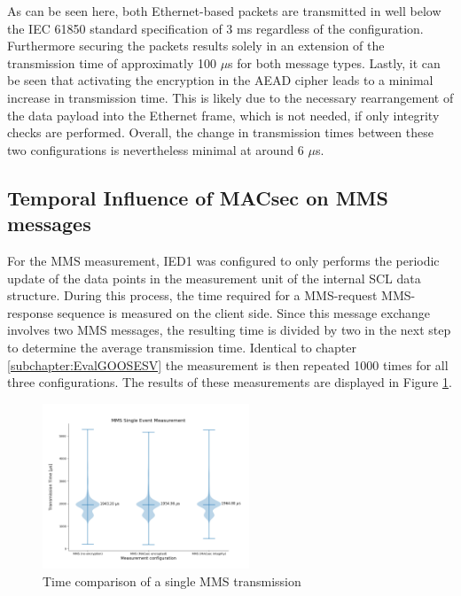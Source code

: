 \documentclass[conference, onecolumn, a4paper]{IEEEtran}
\begin{document}
\noindent As can be seen here, both Ethernet-based packets are transmitted in well below the IEC 61850 standard specification of 3 ms 
\cite{fixedLatencyGOOSESV:2021} regardless of the configuration. Furthermore securing the packets results solely in an extension of the transmission 
time of approximatly 100 $\mu$s for both message types. Lastly, it can be seen that activating the encryption in the AEAD cipher leads to a minimal 
increase in transmission time. This is likely due to the necessary rearrangement of the data payload into the Ethernet frame, which is not needed, 
if only integrity checks are performed. Overall, the change in transmission times between these two configurations is nevertheless minimal at around 
6 $\mu$s. 

\subsection{Temporal Influence of MACsec on MMS messages}
\label{subchapter:EvalMMS}
\noindent For the MMS measurement, IED1 was configured to only performs the periodic update of the data points in the measurement unit of the internal 
SCL data structure. During this process, the time required for a MMS-request MMS-response sequence is measured on the client side. Since this message 
exchange involves two MMS messages, the resulting time is divided by two in the next step to determine the average transmission time. Identical to 
chapter \ref{subchapter:EvalGOOSESV} the measurement is then repeated 1000 times for all three configurations. The results of these measurements are 
displayed in Figure \ref{image:MMSTimings}. 

\begin{figure}[h]
    \centering
    \includegraphics[width=0.55\textwidth]{images/MMS_group_all_configs.png}
    \caption{Time comparison of a single MMS transmission}
    \label{image:MMSTimings}
\end{figure}
\end{document}
